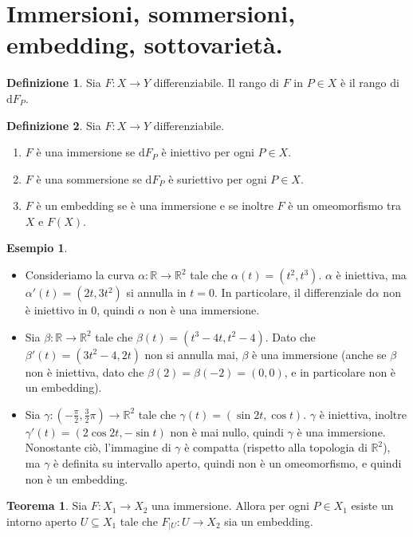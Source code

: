 \documentclass[a4paper,11pt]{article}
\theoremstyle{definition}
\newtheorem{definizione}{Definizione}[section]
\newtheorem{esempio}{Esempio}[section]
\theoremstyle{theorem}
\newtheorem{teorema}{Teorema}[section]
\begin{document}
\section{Immersioni, sommersioni, embedding, sottovarietà.}
\begin{definizione}
	Sia $F\colon X\to Y$ differenziabile. Il rango di $F$ in $P\in X$ è il rango di $\mathrm{d}F_P$.
\end{definizione}
\begin{definizione}Sia $F\colon X\to Y$ differenziabile.
	\begin{enumerate} 
		\item $F$ è una immersione se $\mathrm{d}F_P$ è iniettivo per ogni $P\in X$.
		\item $F$ è una sommersione se $\mathrm{d}F_P$ è suriettivo per ogni $P\in X$.
		\item $F$ è un embedding se è una immersione e se inoltre $F$ è un omeomorfismo tra $X$ e $F(X)$.
	\end{enumerate}
\end{definizione}
\begin{esempio}
	\begin{itemize}
		\item Consideriamo la curva $\alpha\colon\mathbb{R}\to\mathbb{R}^2$ tale che $\alpha(t)=(t^2,t^3)$. $\alpha$ è iniettiva, ma $\alpha'(t)=(2t,3t^2)$ si annulla in $t=0$. In particolare, il differenziale $\mathrm{d}\alpha$ non è iniettivo in 0, quindi $\alpha$ non è una immersione.		
		\item Sia $\beta\colon\mathbb{R}\to\mathbb{R}^2$ tale che $\beta(t)=(t^3-4t,t^2-4)$. Dato che $\beta'(t)=(3t^2-4,2t)$ non si annulla mai, $\beta$ è una immersione (anche se $\beta$ non è iniettiva, dato che $\beta(2)=\beta(-2)=(0,0)$, e in particolare non è un embedding).
		\item Sia $\gamma\colon(-\frac{\pi}{2},\frac{3}{2}\pi)\to\mathbb{R}^2$ tale che $\gamma(t)=(\sin2t,\cos t)$. $\gamma$ è iniettiva, inoltre $\gamma'(t)=(2\cos2t,-\sin t)$ non è mai nullo, quindi $\gamma$ è una immersione. Nonostante ciò, l'immagine di $\gamma$ è compatta (rispetto alla topologia di $\mathbb{R}^2$), ma $\gamma$ è definita su intervallo aperto, quindi non è un omeomorfismo, e quindi non è un embedding.
	\end{itemize}
\end{esempio}
\begin{teorema}
	Sia $F\colon X_1\to X_2$ una immersione. Allora per ogni $P\in X_1$ esiste un intorno aperto $U\subseteq X_1$ tale che $F_{|U}\colon U\to X_2$ sia un embedding.
\end{teorema}
\end{document}
